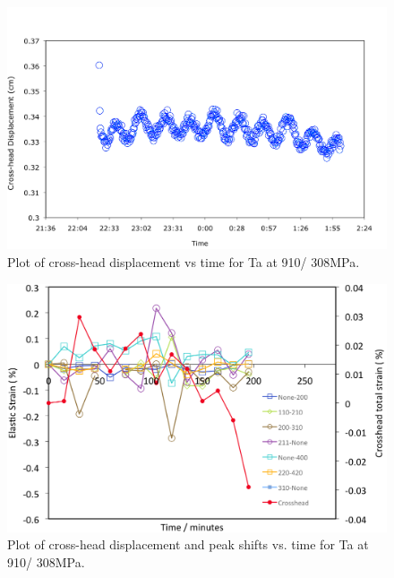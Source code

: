 \begin{figure}[H]
\begin{center}
\includegraphics[width=14cm]{enginxsanta910C308MPa}
\vspace{-2mm}
\caption{Plot of cross-head displacement vs time for Ta at 910\celsius/ 308MPa.}\label{fig:enginxsanta910C308MPa}
\end{center}
\end{figure}  
%
%
\begin{figure}[H]
\begin{center}
\includegraphics[width=16cm]{enginxsanta910C308MPastrain}
\vspace{-2mm}
\caption{Plot of cross-head displacement and peak shifts vs. time for Ta at 910\celsius/ 308MPa.}\label{fig:santa910C308MPastrain}
\end{center}
\end{figure}  
%
%

